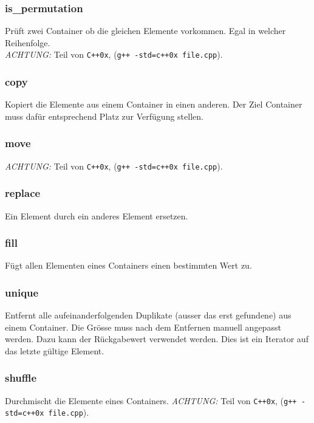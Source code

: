 \begin{frame}[fragile]
\frametitle{is\_permutation}
{\tiny
Prüft zwei Container ob die gleichen Elemente vorkommen. Egal in welcher Reihenfolge.\\
\emph{ACHTUNG:} Teil von \verb|C++0x|, (\verb|g++ -std=c++0x file.cpp|).


}
\end{frame}

\begin{frame}[fragile]
\frametitle{copy}
{\tiny
Kopiert die Elemente aus einem Container in einen anderen. Der Ziel Container muss
dafür entsprechend Platz zur Verfügung stellen.


}
\end{frame}

\begin{frame}[fragile]
\frametitle{move}
{\tiny
\emph{ACHTUNG:} Teil von \verb|C++0x|, (\verb|g++ -std=c++0x file.cpp|).


}
\end{frame}

\begin{frame}[fragile]
\frametitle{replace}
{\tiny
Ein Element durch ein anderes Element ersetzen.


}
\end{frame}

\begin{frame}[fragile]
\frametitle{fill}
{\tiny
Fügt allen Elementen eines Containers einen bestimmten Wert zu.


}
\end{frame}

\begin{frame}[fragile]
\frametitle{unique}
{\tiny
Entfernt alle aufeinanderfolgenden Duplikate (ausser das erst gefundene) aus einem Container.
Die Grösse muss nach dem Entfernen manuell angepasst werden. Dazu kann der Rückgabewert
verwendet werden. Dies ist ein Iterator auf das letzte gültige Element.


}
\end{frame}

\begin{frame}[fragile]
\frametitle{shuffle}
{\tiny
Durchmischt die Elemente eines Containers.
\emph{ACHTUNG:} Teil von \verb|C++0x|, (\verb|g++ -std=c++0x file.cpp|).


}
\end{frame}

